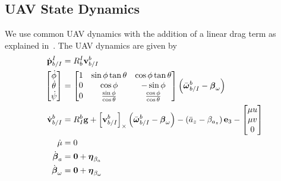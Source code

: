 \subsection{UAV State Dynamics}
We use common UAV dynamics with the addition of a linear drag term as explained
in~\cite{leishman2014accel}. The UAV dynamics are given by
\begin{align}
  \dot{\boldsymbol{\mathrm{p}}}_{b/I}^I
  &=
  R_b^I \boldsymbol{\mathrm{v}}_{b/I}^b 
  \\
  \begin{bmatrix}
    \dot{\phi} \\
    \dot{\theta} \\
    \dot{\psi}
  \end{bmatrix}
  &=
  \begin{bmatrix}
    1 & \sin\phi\tan\theta & \cos\phi\tan\theta \\
    0 & \cos\phi & -\sin\phi \\
    0 & \frac{\sin\phi}{\cos\theta} & \frac{\cos\phi}{\cos\theta}
  \end{bmatrix}
  \left( \bar{\boldsymbol{\mathrm{\omega}}}_{b/I}^b - \boldsymbol{\mathrm{\beta}}_\omega \right)
  \\
  \dot{\boldsymbol{\mathrm{v}}}_{b/I}^b 
  &=
  R_I^b \boldsymbol{\mathrm{g}}
  +
  \left[ \boldsymbol{\mathrm{v}}_{b/I}^b \right]_{\times}
  \left( \bar{\boldsymbol{\mathrm{\omega}}}_{b/I}^b - \boldsymbol{\mathrm{\beta}}_\omega \right)
  -
  \left( \bar{a}_z - \beta_{a_z} \right) \boldsymbol{\mathrm{e}}_3
  -
  \begin{bmatrix}
    \mu u \\
    \mu v \\
    0
  \end{bmatrix}
  \\
  \dot{\mu} &= 0
  \\
  \dot{\boldsymbol{\mathrm{\beta}}}_a &= \boldsymbol{\mathrm{0}} + \boldsymbol{\mathrm{\eta}}_{\beta_a}
  \\
  \dot{\boldsymbol{\mathrm{\beta}}}_\omega &= \boldsymbol{\mathrm{0}} + \boldsymbol{\mathrm{\eta}}_{\beta_\omega}
\end{align}

